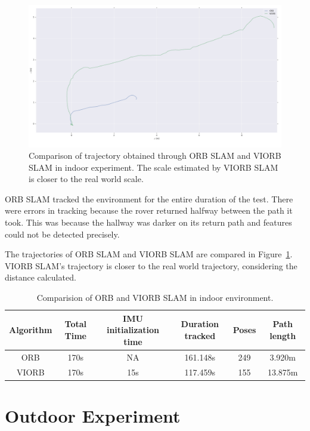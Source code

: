 \begin{figure} [h]
	\centering
	\includegraphics[width=5.5in]{figures/demo2_trajectory}
	\caption[Indoor experiment trajectory]{\small 
		Comparison of trajectory obtained through ORB SLAM and VIORB SLAM in indoor experiment. The scale estimated by VIORB SLAM is closer to the real world scale.}
	\label{fig:indoor-experiment-trajectory}
\end{figure}

ORB SLAM tracked the environment for the entire duration of the test. There were errors in tracking because the rover returned halfway between the path it took. This was because the hallway was darker on its return path and features could not be detected precisely. 


The trajectories of ORB SLAM and VIORB SLAM are compared in Figure~\ref{fig:indoor-experiment-trajectory}. VIORB SLAM's trajectory is closer to the real world trajectory, considering the distance calculated.


\begin{table}[h]
	\caption[Comparision of ORB and VIORB SLAM in indoor environment.]{\small Comparision of ORB and VIORB SLAM in indoor environment.}
	\begin{tabular}{|c|c|c|c|c|c|}
		\hline 
		Algorithm & Total Time & IMU initialization time & Duration tracked & Poses & Path length \\ \hline \hline
		ORB & 170s & NA & 161.148s  & 249 & 3.920m  \\ \hline
		VIORB & 170s & 15s & 117.459s & 155 & 13.875m \\ \hline
	\end{tabular}
	\label{tab:indoor-comparision}
\end{table} 




\section {Outdoor Experiment}

